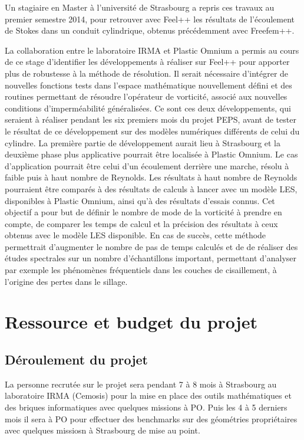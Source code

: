 \documentclass[12pt]{article}
\begin{document}
Un stagiaire en Master à l’université de Strasbourg a  repris ces travaux au
premier semestre 2014, pour retrouver avec Feel++ les résultats de l’écoulement
de Stokes dans un conduit cylindrique, obtenus précédemment avec Freefem++.

La collaboration entre le laboratoire IRMA et Plastic Omnium a permis au cours
de ce stage d’identifier les développements à réaliser sur Feel++ pour apporter
plus de robustesse à la méthode de résolution. Il serait nécessaire d’intégrer
de nouvelles fonctions tests dans l’espace mathématique nouvellement défini et
des routines permettant de résoudre l’opérateur de vorticité, associé aux
nouvelles conditions d’imperméabilité généralisées. Ce sont ces deux
développements, qui seraient à réaliser pendant les six premiers mois du projet
PEPS, avant de tester le résultat de ce développement sur des modèles numériques
différents de celui du cylindre. La première partie de développement aurait lieu
à Strasbourg et la deuxième phase plus applicative pourrait être localisée à
Plastic Omnium. Le cas d’application pourrait être celui d’un écoulement
derrière une marche, résolu à faible puis à haut nombre de Reynolds. Les
résultats à haut nombre de Reynolds pourraient être comparés à des résultats de
calculs à lancer avec un modèle LES, disponibles à Plastic Omnium, ainsi qu’à des
résultats d’essais connus. Cet objectif a pour but de définir le nombre de mode
de la vorticité à prendre en compte, de comparer les temps de calcul et la
précision des résultats à ceux obtenus avec le modèle LES disponible. En cas de
succès, cette méthode permettrait d’augmenter le nombre de pas de temps calculés
et de de réaliser des études spectrales sur un nombre d’échantillons important,
permettant d’analyser par exemple les phénomènes fréquentiels dans les couches
de cisaillement, à l’origine des pertes dans le sillage.



\section{Ressource et budget du projet}
\label{sec:budget}

\subsection{Déroulement du projet}
\label{sec:dero-du-proj}

La personne recrutée sur le projet sera pendant 7 à 8 mois à Strasbourg au
laboratoire IRMA (Cemosis) pour la mise en place des outils mathématiques et des
briques informatiques avec quelques missions à PO. Puis les 4 à 5 derniers mois
il sera à PO pour effectuer des benchmarks sur des géométries propriétaires avec
quelques missiosn à Strasbourg de mise au point.
\end{document}
